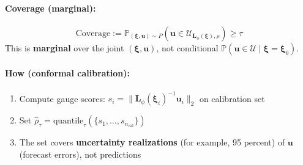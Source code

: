 \documentclass[11pt]{article}
\newcommand{\Prob}{\mathbb{P}}
\newcommand{\cU}{\mathcal{U}}
\newcommand{\bxi}{\bm{\xi}}
\newcommand{\bu}{\bm{u}}
\newcommand{\bL}{\bm{L}}
\theoremstyle{definition}
\begin{document}
\paragraph{Coverage (marginal):}
\begin{equation}\label{eq:coverage}
\boxed{
\text{Coverage} := \Prob_{(\bxi,\bu) \sim P}\left(\bu \in \cU_{\bL_\phi(\bxi),\rho}\right) \ge \tau
}
\end{equation}
This is \textbf{marginal} over the joint $(\bxi, \bu)$, not conditional $\Prob(\bu \in \cU \mid \bxi = \bxi_0)$.

\paragraph{How (conformal calibration):}
\begin{enumerate}[leftmargin=2em, itemsep=1pt]
\item Compute gauge scores: $s_i = \|\bL_\phi(\bxi_i)^{-1} \bu_i\|_2$ on calibration set
\item Set $\hat{\rho}_\tau = \text{quantile}_\tau(\{s_1, \ldots, s_{n_{\text{cal}}}\})$
\item The set covers \textbf{uncertainty realizations} (for example, 95 percent) of $\bu$ (forecast errors), not predictions
\end{enumerate}
\end{document}
